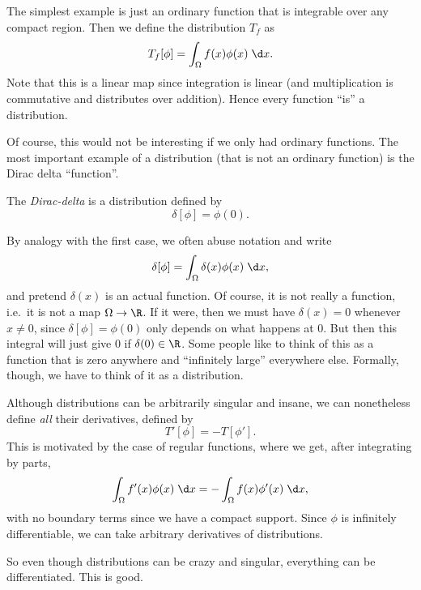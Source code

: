 \documentclass[a4paper]{article}
\begin{document}
\begin{eg}
  The simplest example is just an ordinary function that is integrable over any compact region. Then we define the distribution $T_f$ as
  \[
    T_f[\phi] = \int_\Omega f(x) \phi(x) \;\d x.
  \]
  Note that this is a linear map since integration is linear (and multiplication is commutative and distributes over addition). Hence every function ``is'' a distribution.
\end{eg}
Of course, this would not be interesting if we only had ordinary functions. The most important example of a distribution (that is not an ordinary function) is the Dirac delta ``function''.
\begin{defi}
  The \emph{Dirac-delta} is a distribution defined by
  \[
    \delta[\phi] = \phi(0).
  \]
\end{defi}
By analogy with the first case, we often abuse notation and write
\[
  \delta[\phi] = \int_\Omega \delta(x) \phi(x) \;\d x,
\]
and pretend $\delta(x)$ is an actual function. Of course, it is not really a function, i.e.\ it is not a map $\Omega \to \R$. If it were, then we must have $\delta(x) = 0$ whenever $x \not = 0$, since $\delta[\phi] = \phi(0)$ only depends on what happens at $0$. But then this integral will just give $0$ if $\delta(0) \in \R$. Some people like to think of this as a function that is zero anywhere and ``infinitely large'' everywhere else. Formally, though, we have to think of it as a distribution.

Although distributions can be arbitrarily singular and insane, we can nonetheless define \emph{all} their derivatives, defined by
\[
  T'[\phi] = -T[\phi'].
\]
This is motivated by the case of regular functions, where we get, after integrating by parts,
\[
  \int_\Omega f'(x) \phi(x)\;\d x = -\int_\Omega f(x)\phi'(x) \;\d x,
\]
with no boundary terms since we have a compact support. Since $\phi$ is infinitely differentiable, we can take arbitrary derivatives of distributions.

So even though distributions can be crazy and singular, everything can be differentiated. This is good.
\end{document}
